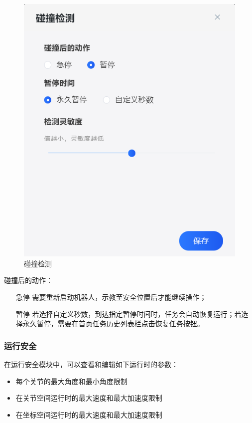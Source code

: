 \begin{figure}[htb]
{\begin{minipage}[t]{0.48\linewidth}
		\includegraphics[width=\linewidth]{screen/3-26-2.png}
	\end{minipage}}
	\caption{碰撞检测}
	\label{fig:碰撞检测设置}
\end{figure}

碰撞后的动作：
\begin{itemize}
	\item[急停] 需要重新启动机器人，示教至安全位置后才能继续操作；
	\item[暂停] 若选择自定义秒数，到达指定暂停时间时，任务会自动恢复运行；若选择永久暂停，需要在首页任务历史列表栏点击恢复任务按钮。
\end{itemize}

\subsubsection{运行安全}
\label{sec:运行安全}
在运行安全模块中，可以查看和编辑如下运行时的参数：
\begin{itemize}
	\item 每个关节的最大角度和最小角度限制
	\item 在关节空间运行时的最大速度和最大加速度限制
	\item 在坐标空间运行时的最大速度和最大加速度限制
\end{itemize}

